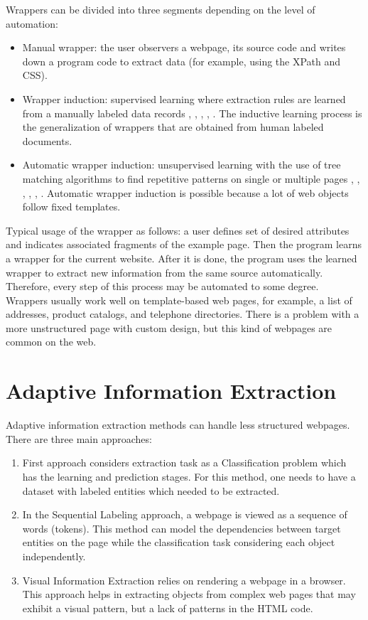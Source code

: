 \noindent Wrappers can be divided into three segments depending on the level of automation:
\begin{itemize}
    \item Manual wrapper: the user observers a webpage, its source code and writes down a program code to extract data (for example, using the XPath and CSS).
    \item Wrapper induction: supervised learning where extraction rules are learned from a manually labeled data records \cite{Hsu}, \cite{BotUp}, \cite{Stalker}, \cite{Wien}, \cite{Rapier} \cite{SRV} \cite{Vide}. The inductive learning process is the generalization of wrappers that are obtained from human labeled documents. 
    \item Automatic wrapper induction: unsupervised learning with the use of tree matching algorithms to find repetitive patterns on single or multiple pages \cite{Qiu}, \cite{Dalvi}, \cite{Diadem}, \cite{Roadrunner}, \cite{LiuMinData}, \cite{Urest}. Automatic wrapper induction is possible because a lot of web objects follow fixed templates.
\end{itemize}

Typical usage of the wrapper as follows: a user defines set of desired attributes and indicates associated fragments of the example page. Then the program learns a wrapper for the current website. After it is done, the program uses the learned wrapper to extract new information from the same source automatically. Therefore, every step of this process may be automated to some degree. \\

Wrappers usually work well on template-based web pages, for example, a list of addresses, product catalogs, and telephone directories. There is a problem with a more unstructured page with custom design, but this kind of webpages are common on the web.

\section{Adaptive Information Extraction}

Adaptive information extraction methods can handle less structured webpages. There are three main approaches:

\begin{enumerate}
    \item First approach considers extraction task as a Classification problem which has the learning and prediction stages. For this method, one needs to have a dataset with labeled entities which needed to be extracted. 
    \item In the Sequential Labeling approach, a webpage is viewed as a sequence of words (tokens). This method can model the dependencies between target entities on the page while the classification task considering each object independently.
    \item Visual Information Extraction relies on rendering a webpage in a browser. This approach helps in extracting objects from complex web pages that may exhibit a visual pattern, but a lack of patterns in the HTML code.
\end{enumerate}

